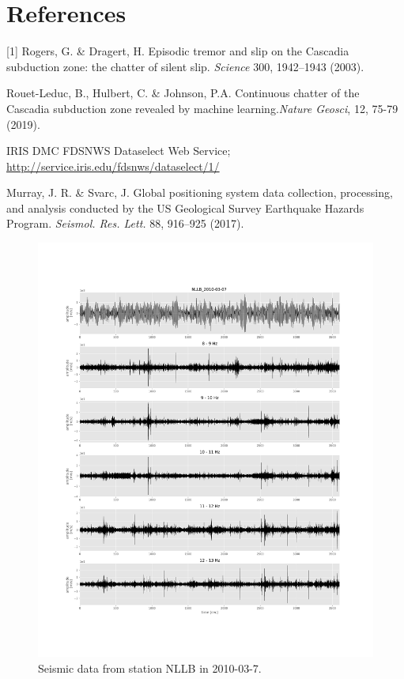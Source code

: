 \documentclass{article}
\begin{document}
\vspace*{5cm}
\section{References}

[1] Rogers, G. \& Dragert, H. Episodic tremor and slip on the Cascadia subduction zone: the chatter of silent slip. \textit{Science} 300, 1942–1943 (2003).

\vspace{0.1cm}

\noindent [2] Rouet-Leduc, B., Hulbert, C. \& Johnson, P.A. Continuous chatter of the Cascadia subduction zone revealed by machine learning.\textit{Nature Geosci}, 12, 75-79 (2019).

\vspace{0.1cm}

\noindent [3] IRIS DMC FDSNWS Dataselect Web Service; \url{http://service.iris.edu/fdsnws/dataselect/1/}

\vspace{0.1cm}

\noindent [4] Murray, J. R. \& Svarc, J. Global positioning system data collection, processing, and analysis conducted by the US Geological Survey Earthquake Hazards Program. \textit{Seismol. Res. Lett.} 88, 916–925 (2017).


\begin{figure}[h!]
    \centering
    \includegraphics[width=1.\linewidth, height = 1.\linewidth]{seismic.png}
    \caption{Seismic data from station NLLB in 2010-03-7.}
    \label{fig:seismic}
\end{figure}
\end{document}
